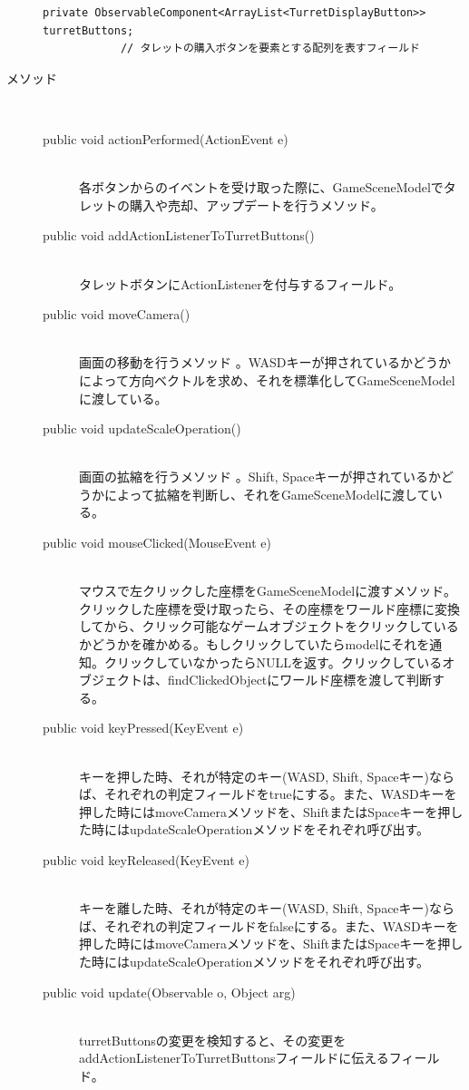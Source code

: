 \documentclass[11pt,a4j]{jarticle}
\begin{document}
\begin{description}
\begin{lstlisting}[numbers=none]
            private ObservableComponent<ArrayList<TurretDisplayButton>> turretButtons;
            // タレットの購入ボタンを要素とする配列を表すフィールド
                \end{lstlisting}
    \item[メソッド]\mbox{}\\
          \begin{description}
              \item[public void actionPerformed(ActionEvent e)]\mbox{}\\
                    各ボタンからのイベントを受け取った際に、GameSceneModelでタレットの購入や売却、アップデートを行うメソッド。
              \item[public void addActionListenerToTurretButtons()]\mbox{}\\
                    タレットボタンにActionListenerを付与するフィールド。
              \item[public void moveCamera()]\mbox{}\\
                    画面の移動を行うメソッド 。WASDキーが押されているかどうかによって方向ベクトルを求め、それを標準化してGameSceneModelに渡している。
              \item[public void updateScaleOperation()]\mbox{}\\
                    画面の拡縮を行うメソッド 。Shift, Spaceキーが押されているかどうかによって拡縮を判断し、それをGameSceneModelに渡している。
              \item[public void mouseClicked(MouseEvent e)] \mbox{}\\
                    マウスで左クリックした座標をGameSceneModelに渡すメソッド。クリックした座標を受け取ったら、その座標をワールド座標に変換してから、クリック可能なゲームオブジェクトをクリックしているかどうかを確かめる。もしクリックしていたらmodelにそれを通知。クリックしていなかったらNULLを返す。クリックしているオブジェクトは、findClickedObjectにワールド座標を渡して判断する。
              \item[public void keyPressed(KeyEvent e)] \mbox{}\\
                    キーを押した時、それが特定のキー(WASD, Shift, Spaceキー)ならば、それぞれの判定フィールドをtrueにする。また、WASDキーを押した時にはmoveCameraメソッドを、ShiftまたはSpaceキーを押した時にはupdateScaleOperationメソッドをそれぞれ呼び出す。
              \item[public void keyReleased(KeyEvent e)] \mbox{}\\
                    キーを離した時、それが特定のキー(WASD, Shift, Spaceキー)ならば、それぞれの判定フィールドをfalseにする。また、WASDキーを押した時にはmoveCameraメソッドを、ShiftまたはSpaceキーを押した時にはupdateScaleOperationメソッドをそれぞれ呼び出す。
              \item[public void update(Observable o, Object arg)] \mbox{}\\
                    turretButtonsの変更を検知すると、その変更をaddActionListenerToTurretButtonsフィールドに伝えるフィールド。
          \end{description}
\end{description}
\end{document}
